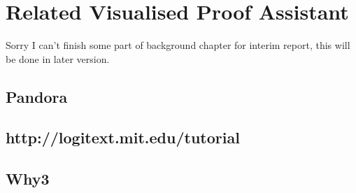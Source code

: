 \section{Related Visualised Proof Assistant}
Sorry I can't finish some part of background chapter for interim report, this will be done in later version.

\subsection{Pandora}
\subsection{http://logitext.mit.edu/tutorial}
\subsection{Why3}
